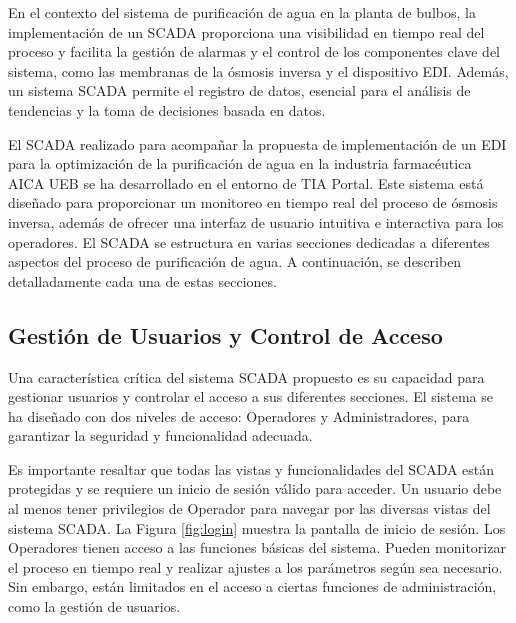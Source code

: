 En el contexto del sistema de purificación de agua en la planta de bulbos, la implementación de
un SCADA proporciona una visibilidad en tiempo real del proceso y facilita la
gestión de alarmas y el control de los componentes clave del sistema, como las membranas
de la ósmosis inversa y el dispositivo EDI. Además, un sistema SCADA permite el
registro de datos, esencial para el análisis de tendencias y la toma de decisiones
basada en datos.

El SCADA realizado para acompañar la propuesta de implementación de un EDI para la optimización de la purificación de agua en la
industria farmacéutica AICA UEB se ha desarrollado en el entorno de TIA Portal.
Este sistema está diseñado para proporcionar un monitoreo en tiempo real del proceso de ósmosis inversa, además de ofrecer una interfaz de usuario intuitiva e interactiva para los operadores.
El SCADA se estructura en varias secciones dedicadas a diferentes aspectos del proceso de purificación de agua. A continuación, se describen detalladamente cada una de estas secciones.


\subsection{Gestión de Usuarios y Control de Acceso}

Una característica crítica del sistema SCADA propuesto es su capacidad para gestionar usuarios y controlar el acceso a sus diferentes secciones. El sistema se ha diseñado con dos niveles de acceso: Operadores y Administradores, para garantizar la seguridad y funcionalidad adecuada.

Es importante resaltar que todas las vistas y funcionalidades del SCADA están protegidas y se requiere un inicio de sesión válido para acceder. Un usuario debe al menos tener privilegios de Operador para navegar por las diversas vistas del sistema SCADA. La Figura \ref{fig:login} muestra la pantalla de inicio de sesión.
Los Operadores tienen acceso a las funciones básicas del sistema. Pueden monitorizar el proceso en tiempo real y realizar ajustes a los parámetros según sea necesario. Sin embargo, están limitados en el acceso a ciertas funciones de administración, como la gestión de usuarios.

